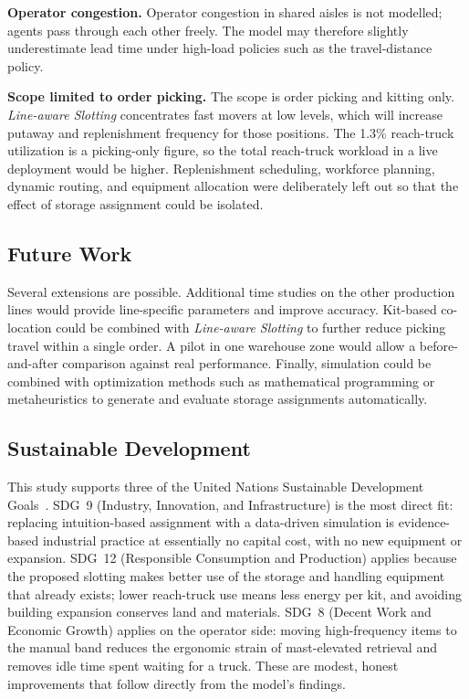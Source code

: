 \documentclass[conference]{IEEEtran}
\newcommand{\policy}[1]{\textit{#1}}
\begin{document}
\textbf{Operator congestion.} Operator congestion in shared aisles is not
modelled; agents pass through each other freely. The model may therefore
slightly underestimate lead time under high-load policies such as the
travel-distance policy.

\textbf{Scope limited to order picking.} The scope is order picking and
kitting only. \policy{Line-aware Slotting} concentrates fast movers at low
levels, which will increase putaway and replenishment frequency for those
positions. The 1.3\% reach-truck utilization is a picking-only figure, so the
total reach-truck workload in a live deployment would be higher. Replenishment
scheduling, workforce planning, dynamic routing, and equipment allocation were
deliberately left out so that the effect of storage assignment could be
isolated.

\subsection{Future Work}
Several extensions are possible. Additional time studies on the other
production lines would provide line-specific parameters and improve accuracy.
Kit-based co-location could be combined with \policy{Line-aware Slotting} to
further reduce picking travel within a single order. A pilot in one warehouse
zone would allow a before-and-after comparison against real performance.
Finally, simulation could be combined with optimization methods such as
mathematical programming or metaheuristics to generate and evaluate storage
assignments automatically.

\subsection{Sustainable Development}
This study supports three of the United Nations Sustainable Development
Goals~\cite{un_sdg}. SDG~9 (Industry, Innovation, and Infrastructure) is the
most direct fit: replacing intuition-based assignment with a data-driven
simulation is evidence-based industrial practice at essentially no capital
cost, with no new equipment or expansion. SDG~12 (Responsible Consumption and
Production) applies because the proposed slotting makes better use of the
storage and handling equipment that already exists; lower reach-truck use
means less energy per kit, and avoiding building expansion conserves land and
materials. SDG~8 (Decent Work and Economic Growth) applies on the operator
side: moving high-frequency items to the manual band reduces the ergonomic
strain of mast-elevated retrieval and removes idle time spent waiting for a
truck. These are modest, honest improvements that follow directly from the
model's findings.
\end{document}
